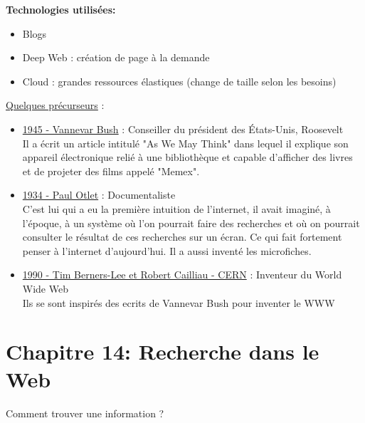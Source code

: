 \documentclass{article}
\begin{document}
\vspace * {0.3cm}
\begin{minipage}{15cm}
\textbf{Technologies utilisées:}
    \begin{itemize}
        \item Blogs 
        \item Deep Web : création de page à la demande 
        \item Cloud : grandes ressources élastiques (change de taille                      selon les besoins) 
    \end{itemize}
\end{minipage}

\vspace{0.5cm}       

\newpage

\vspace * {0.5cm}
    
    \vspace{0.3cm}
    
    \underline{Quelques précurseurs} :
    
    \begin{itemize}
        \item \underline{1945 - Vannevar Bush} : Conseiller du président des États-Unis, Roosevelt\\ 
        Il a écrit un article intitulé "As We May Think" dans lequel il explique son appareil électronique relié à une bibliothèque et capable d'afficher des livres et de projeter des films appelé "Memex".
        \item \underline{1934 - Paul Otlet} : Documentaliste\\ 
        C'est lui qui a eu la première intuition de l'internet, il avait imaginé, à l'époque, à un système où l'on pourrait faire des recherches et où on pourrait consulter le résultat de ces recherches sur un écran. Ce qui fait fortement penser à l'internet d'aujourd'hui. Il a aussi inventé les microfiches.
        \item \underline{1990 - Tim Berners-Lee et  Robert Cailliau - CERN} : Inventeur du World Wide Web\\
        Ils se sont inspirés des ecrits de Vannevar Bush pour inventer le WWW
    \end{itemize}
    
\vspace * {0.5cm}   


\section{Chapitre 14: Recherche dans le Web}
Comment trouver une information ?
\vspace{0.3cm}
\end{document}

